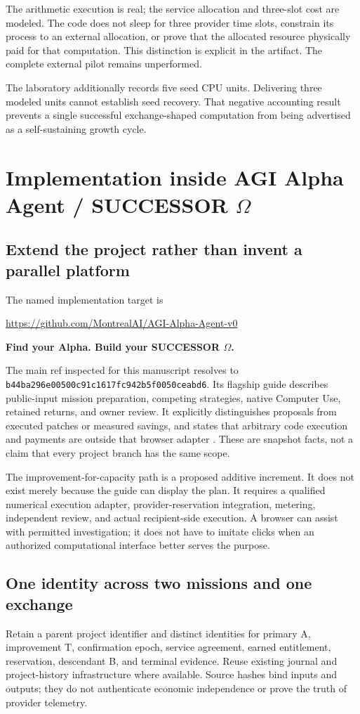 \documentclass[11pt,letterpaper]{article}
\theoremstyle{remark}\newtheorem{remark}{Remark}[section]
\begin{document}
The arithmetic execution is real; the service allocation and three-slot cost are modeled. The code does not sleep for three provider time slots, constrain its process to an external allocation, or prove that the allocated resource physically paid for that computation. This distinction is explicit in the artifact. The complete external pilot remains unperformed.

The laboratory additionally records five seed CPU units. Delivering three modeled units cannot establish seed recovery. That negative accounting result prevents a single successful exchange-shaped computation from being advertised as a self-sustaining growth cycle.

\section{Implementation inside AGI Alpha Agent / SUCCESSOR \texorpdfstring{$\Omega$}{Omega}}
\label{sec:implementation}
\subsection{Extend the project rather than invent a parallel platform}
The named implementation target is
\begin{center}
\url{https://github.com/MontrealAI/AGI-Alpha-Agent-v0}\par\smallskip
\textbf{Find your Alpha. Build your SUCCESSOR $\Omega$.}
\end{center}
The main ref inspected for this manuscript resolves to \texttt{b44ba296e00500c91c1617fc942b5f0050ceabd6}. Its flagship guide describes public-input mission preparation, competing strategies, native Computer Use, retained returns, and owner review. It explicitly distinguishes proposals from executed patches or measured savings, and states that arbitrary code execution and payments are outside that browser adapter \citep{alphaGuide}. These are snapshot facts, not a claim that every project branch has the same scope.

The improvement-for-capacity path is a proposed additive increment. It does not exist merely because the guide can display the plan. It requires a qualified numerical execution adapter, provider-reservation integration, metering, independent review, and actual recipient-side execution. A browser can assist with permitted investigation; it does not have to imitate clicks when an authorized computational interface better serves the purpose.

\subsection{One identity across two missions and one exchange}
Retain a parent project identifier and distinct identities for primary A, improvement T, confirmation epoch, service agreement, earned entitlement, reservation, descendant B, and terminal evidence. Reuse existing journal and project-history infrastructure where available. Source hashes bind inputs and outputs; they do not authenticate economic independence or prove the truth of provider telemetry.
\end{document}
